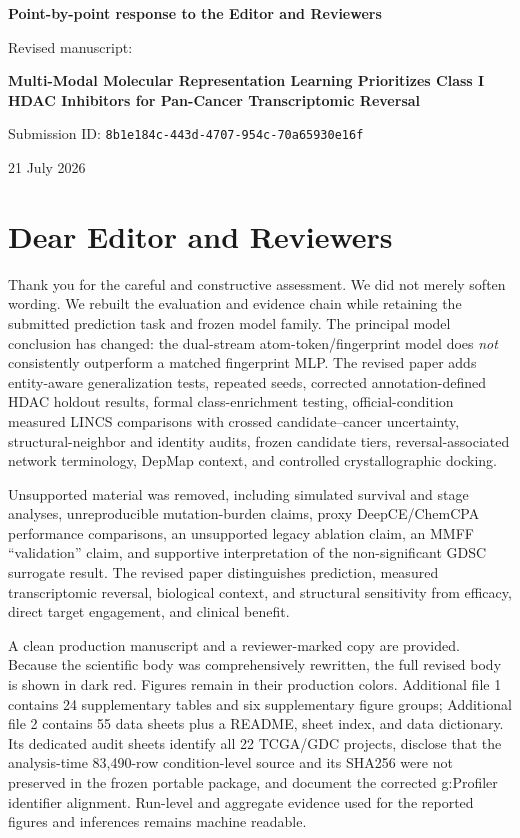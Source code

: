 \documentclass[10pt]{article}
\begin{document}
\begin{center}
{\Large\bfseries Point-by-point response to the Editor and Reviewers}\par
\vspace{0.45em}
{\large Revised manuscript:}\par
\textbf{Multi-Modal Molecular Representation Learning Prioritizes Class I HDAC Inhibitors for Pan-Cancer Transcriptomic Reversal}\par
\vspace{0.35em}
Submission ID: \texttt{8b1e184c-443d-4707-954c-70a65930e16f}\par
21 July 2026
\end{center}

\section*{Dear Editor and Reviewers}

Thank you for the careful and constructive assessment. We did not merely soften wording. We rebuilt the evaluation and evidence chain while retaining the submitted prediction task and frozen model family. The principal model conclusion has changed: the dual-stream atom-token/fingerprint model does \emph{not} consistently outperform a matched fingerprint MLP. The revised paper adds entity-aware generalization tests, repeated seeds, corrected annotation-defined HDAC holdout results, formal class-enrichment testing, official-condition measured LINCS comparisons with crossed candidate--cancer uncertainty, structural-neighbor and identity audits, frozen candidate tiers, reversal-associated network terminology, DepMap context, and controlled crystallographic docking.

Unsupported material was removed, including simulated survival and stage analyses, unreproducible mutation-burden claims, proxy DeepCE/ChemCPA performance comparisons, an unsupported legacy ablation claim, an MMFF ``validation'' claim, and supportive interpretation of the non-significant GDSC surrogate result. The revised paper distinguishes prediction, measured transcriptomic reversal, biological context, and structural sensitivity from efficacy, direct target engagement, and clinical benefit.

A clean production manuscript and a reviewer-marked copy are provided. Because the scientific body was comprehensively rewritten, the full revised body is shown in dark red. Figures remain in their production colors. Additional file 1 contains 24 supplementary tables and six supplementary figure groups; Additional file 2 contains 55 data sheets plus a README, sheet index, and data dictionary. Its dedicated audit sheets identify all 22 TCGA/GDC projects, disclose that the analysis-time 83,490-row condition-level source and its SHA256 were not preserved in the frozen portable package, and document the corrected g:Profiler identifier alignment. Run-level and aggregate evidence used for the reported figures and inferences remains machine readable.
\end{document}
